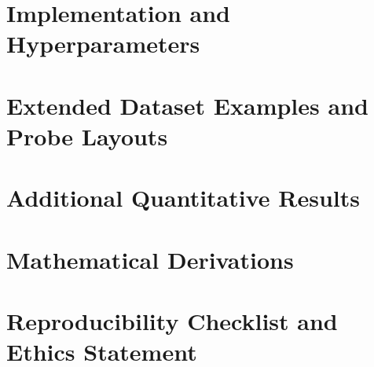 \appendix
\chapter{Implementation and Hyperparameters}
\chapter{Extended Dataset Examples and Probe Layouts}
\chapter{Additional Quantitative Results}
\chapter{Mathematical Derivations}
\chapter{Reproducibility Checklist and Ethics Statement}